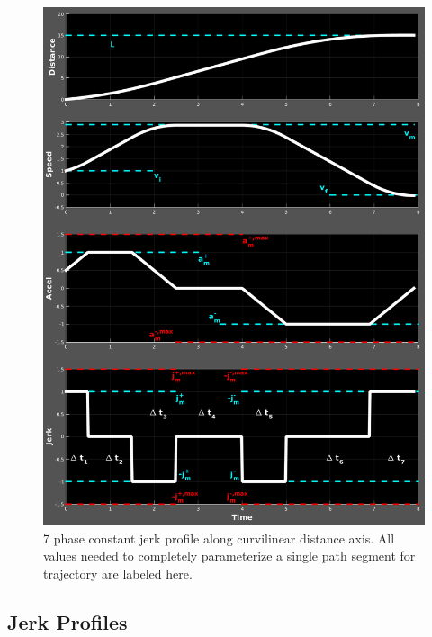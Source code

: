 \documentclass[letterpaper, 10 pt, conference]{ieeeconf}  %
\begin{document}
\begin{figure}[thpb]
  \centering
  \includegraphics[width=1.0\columnwidth]{graphics/Full7PhaseSpecVertical.png}
  \caption{
    7 phase constant jerk profile along curvilinear distance axis.
    All values needed to completely parameterize a single path segment for trajectory are labeled here.}
  \label{fig:full7phasespec}
\end{figure}


\subsection{Jerk Profiles} \label{sec:jerkprofiles}
\end{document}
